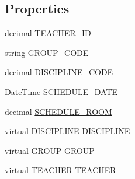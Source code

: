 \subsection*{Properties}
\begin{DoxyCompactItemize}
\item 
decimal \hyperlink{class_e_f_oracle_1_1_model_1_1_s_c_h_e_d_u_l_e_a68935d61b8eb7170cd88d9d90b803b05}{T\+E\+A\+C\+H\+E\+R\+\_\+\+ID}
\item 
string \hyperlink{class_e_f_oracle_1_1_model_1_1_s_c_h_e_d_u_l_e_aa0b33a5dbbf6c590afd18a5589e5427f}{G\+R\+O\+U\+P\+\_\+\+C\+O\+DE}
\item 
decimal \hyperlink{class_e_f_oracle_1_1_model_1_1_s_c_h_e_d_u_l_e_ac6a505dacf6cc2d8575672f1041a68f7}{D\+I\+S\+C\+I\+P\+L\+I\+N\+E\+\_\+\+C\+O\+DE}
\item 
Date\+Time \hyperlink{class_e_f_oracle_1_1_model_1_1_s_c_h_e_d_u_l_e_ae7a440479613292131125de6422126ed}{S\+C\+H\+E\+D\+U\+L\+E\+\_\+\+D\+A\+TE}
\item 
decimal \hyperlink{class_e_f_oracle_1_1_model_1_1_s_c_h_e_d_u_l_e_abeac12f973abfb2f7811b88680e480b1}{S\+C\+H\+E\+D\+U\+L\+E\+\_\+\+R\+O\+OM}
\item 
virtual \hyperlink{class_e_f_oracle_1_1_model_1_1_d_i_s_c_i_p_l_i_n_e}{D\+I\+S\+C\+I\+P\+L\+I\+NE} \hyperlink{class_e_f_oracle_1_1_model_1_1_s_c_h_e_d_u_l_e_abd6e267b33f3d63e1ebcf0f669da66f1}{D\+I\+S\+C\+I\+P\+L\+I\+NE}
\item 
virtual \hyperlink{class_e_f_oracle_1_1_model_1_1_g_r_o_u_p}{G\+R\+O\+UP} \hyperlink{class_e_f_oracle_1_1_model_1_1_s_c_h_e_d_u_l_e_a5d9abb16390ba4706d7e38dda10f51ce}{G\+R\+O\+UP}
\item 
virtual \hyperlink{class_e_f_oracle_1_1_model_1_1_t_e_a_c_h_e_r}{T\+E\+A\+C\+H\+ER} \hyperlink{class_e_f_oracle_1_1_model_1_1_s_c_h_e_d_u_l_e_ac72f394cae43d132907b123022a6006e}{T\+E\+A\+C\+H\+ER}
\end{DoxyCompactItemize}



